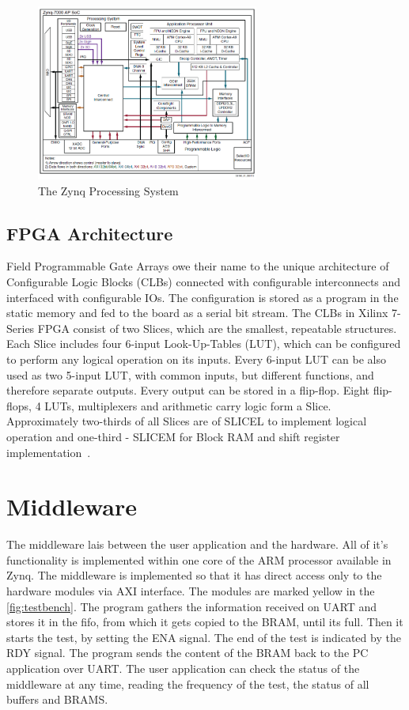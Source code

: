 \begin{figure}[H]
\centering
\includegraphics[width=0.65\textwidth]{figures/Zynq.png}
\caption{The Zynq Processing System~\cite{book:ZynqBook}}
\label{fig:Zynq}
\end{figure}

\subsection{FPGA Architecture}\label{ssec:SLICE}
Field Programmable Gate Arrays owe their name to the unique architecture of Configurable Logic Blocks (CLBs) connected with configurable interconnects and interfaced with configurable IOs. The configuration is stored as a program in the static memory and fed to the board as a serial bit stream. The CLBs in Xilinx 7-Series FPGA consist of two Slices, which are the smallest, repeatable structures. Each Slice includes four 6-input Look-Up-Tables (LUT), which can be configured to perform any logical operation on its inputs. Every 6-input LUT can be also used as two 5-input LUT, with common inputs, but different functions, and therefore separate outputs. Every output can be stored in a flip-flop. Eight flip-flops, 4 LUTs, multiplexers and arithmetic carry logic form a Slice. Approximately two-thirds of all Slices are of SLICEL to implement logical operation and one-third - SLICEM for Block RAM and shift register implementation~\cite{report:CLB}.

\section{Middleware}
The middleware lais between the user application and the hardware. All of it's functionality is implemented within one core of the ARM processor available in Zynq. The middleware is implemented so that it has direct access only to the hardware modules via AXI interface. The modules are marked yellow in the \autoref{fig:testbench}. The program gathers the information received on UART and stores it in the fifo, from which it gets copied to the BRAM, until its full. Then it starts the test, by setting the ENA signal. The end of the test is indicated by the RDY signal. The program sends the content of the BRAM back to the PC application over UART. The user application can check the status of the middleware at any time, reading the frequency of the test, the status of all buffers and BRAMS.

